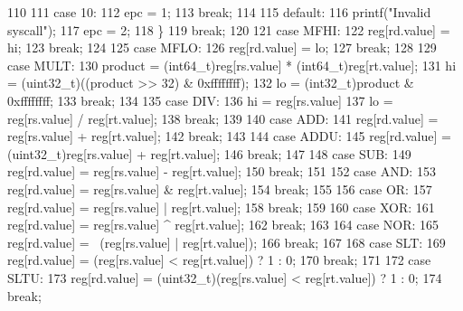 \begin{DoxyCode}
{{110 
111             \textcolor{keywordflow}{case} 10:
112                 epc = 1;
113                 \textcolor{keywordflow}{break};
114 
115             \textcolor{keywordflow}{default}:
116                 printf(\textcolor{stringliteral}{"Invalid syscall"});
117                 epc = 2;
118             \}
119             \textcolor{keywordflow}{break};
120 
121         \textcolor{keywordflow}{case} MFHI:
122             reg[rd.value] = hi;
123             \textcolor{keywordflow}{break};
124 
125         \textcolor{keywordflow}{case} MFLO:
126             reg[rd.value] = lo;
127             \textcolor{keywordflow}{break};
128 
129         \textcolor{keywordflow}{case} MULT:
130             product = (int64\_t)reg[rs.value] * (int64\_t)reg[rt.value];
131             hi = (uint32\_t)((product >> 32) & 0xffffffff);
132             lo = (int32\_t)product & 0xffffffff;
133             \textcolor{keywordflow}{break};
134 
135         \textcolor{keywordflow}{case} DIV:
136             hi = reg[rs.value] %
137             lo = reg[rs.value] / reg[rt.value];
138             \textcolor{keywordflow}{break};
139 
140         \textcolor{keywordflow}{case} ADD:
141             reg[rd.value] = reg[rs.value] + reg[rt.value];
142             \textcolor{keywordflow}{break};
143 
144         \textcolor{keywordflow}{case} ADDU:
145             reg[rd.value] = (uint32\_t)reg[rs.value] + reg[rt.value];
146             \textcolor{keywordflow}{break};
147 
148         \textcolor{keywordflow}{case} SUB:
149             reg[rd.value] = reg[rs.value] - reg[rt.value];
150             \textcolor{keywordflow}{break};
151 
152         \textcolor{keywordflow}{case} AND:
153             reg[rd.value] = reg[rs.value] & reg[rt.value];
154             \textcolor{keywordflow}{break};
155 
156         \textcolor{keywordflow}{case} OR:
157             reg[rd.value] = reg[rs.value] | reg[rt.value];
158             \textcolor{keywordflow}{break};
159 
160         \textcolor{keywordflow}{case} XOR:
161             reg[rd.value] = reg[rs.value] ^ reg[rt.value];
162             \textcolor{keywordflow}{break};
163 
164         \textcolor{keywordflow}{case} NOR:
165             reg[rd.value] = ~(reg[rs.value] | reg[rt.value]);
166             \textcolor{keywordflow}{break};
167 
168         \textcolor{keywordflow}{case} SLT:
169             reg[rd.value] = (reg[rs.value] < reg[rt.value]) ? 1 : 0;
170             \textcolor{keywordflow}{break};
171 
172         \textcolor{keywordflow}{case} SLTU:
173             reg[rd.value] = (uint32\_t)(reg[rs.value] < reg[rt.value]) ? 1 : 0;
174             \textcolor{keywordflow}{break};
}}
\end{DoxyCode}
